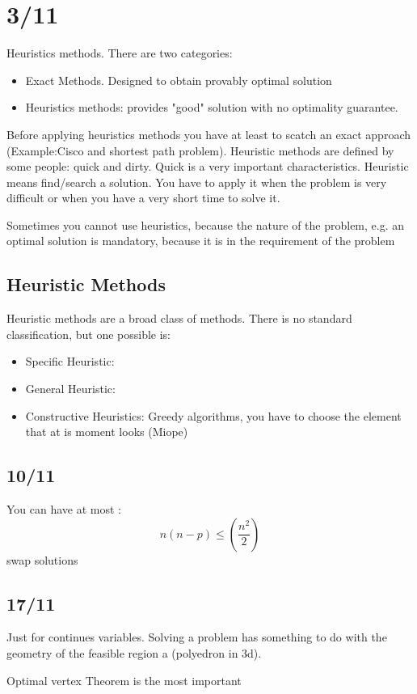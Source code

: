 \documentclass{scrartcl}
\begin{document}
\section{3/11}
Heuristics methods.
There are two categories:
\begin{itemize}
	\item Exact Methods. Designed to obtain provably optimal solution
	\item Heuristics methods: provides "good" solution with no optimality guarantee.
\end{itemize}
Before applying heuristics methods you have at least to scatch an exact approach (Example:Cisco 
and shortest path problem).
Heuristic methods are defined by some people: quick and dirty.
Quick is a very important characteristics.
Heuristic means find/search a solution. You have to apply it
when the problem is very difficult or when you have a very short time to solve it.

Sometimes you cannot use heuristics, because the nature of the problem,
e.g. an optimal solution is mandatory, because it is in the requirement of the problem

\subsection{Heuristic Methods}
Heuristic methods are a broad class of methods. There is no standard classification,
but one possible is:
\begin{itemize}
	\item Specific Heuristic:
	\item General Heuristic:
\end{itemize}
\begin{itemize}
	\item Constructive Heuristics: Greedy algorithms, you have to choose
	the element that at is moment looks (Miope)
\end{itemize}

\subsection{10/11}
You can have at most :
$$
n (n - p) \leq \left(\frac{n^2}{2}\right)
$$
swap solutions

\subsection{17/11}
Just for continues variables.
Solving a problem has something to do with the geometry of the feasible region a (polyedron in 3d).

Optimal vertex Theorem is the most important
\end{document}
